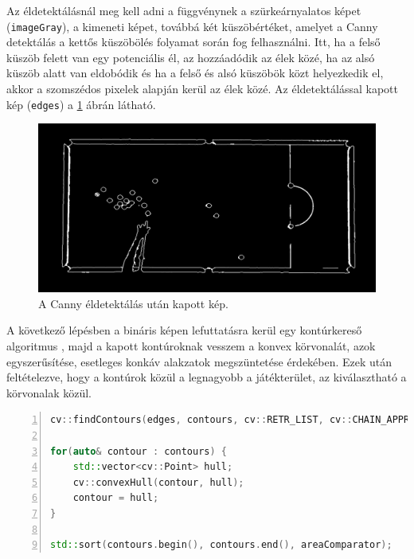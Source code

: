 \par Az éldetektálásnál meg kell adni a függvénynek a szürkeárnyalatos képet (\lstinline{imageGray}), a kimeneti képet, továbbá két küszöbértéket, amelyet a Canny detektálás a kettős küszöbölés folyamat során fog felhasználni. Itt, ha a felső küszöb felett van egy potenciális él, az hozzáadódik az élek közé, ha az alsó küszöb alatt van eldobódik és ha a felső és alsó küszöbök közt helyezkedik el, akkor a szomszédos pixelek alapján kerül az élek közé. Az éldetektálással kapott kép (\lstinline{edges}) a \ref{fig:bemeneti_kep_edge} ábrán látható.

\begin{figure}[!ht]
    \centering
    \includegraphics[width=140mm, keepaspectratio]{figures/input_screen_edge.png}
    \caption{A Canny éldetektálás után kapott kép.}
    \label{fig:bemeneti_kep_edge}
\end{figure}

\par A következő lépésben a bináris képen lefuttatásra kerül egy kontúrkereső algoritmus \cite{SUZUKI198532}, majd a kapott kontúroknak vesszem a konvex körvonalát, azok egyszerűsítése, esetleges konkáv alakzatok megszüntetése érdekében. Ezek után feltételezve, hogy a kontúrok közül a legnagyobb a játékterület, az kiválasztható a körvonalak közül.

\vspace{5mm}
\hspace{-10mm}
\begin{minipage}{\linewidth}
\begin{lstlisting}[language=C++, numbers=left, caption={Kontúrok keresése.}, label={cod:contours}]
cv::findContours(edges, contours, cv::RETR_LIST, cv::CHAIN_APPROX_SIMPLE);

for(auto& contour : contours) {
    std::vector<cv::Point> hull;
    cv::convexHull(contour, hull);
    contour = hull;
}

std::sort(contours.begin(), contours.end(), areaComparator);
\end{lstlisting}
\end{minipage}

